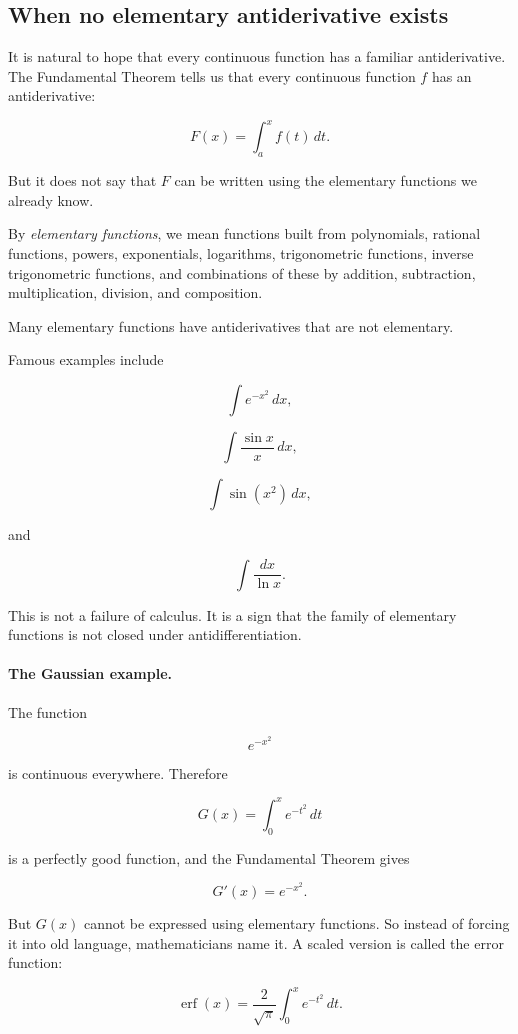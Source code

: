 \subsection{When no elementary antiderivative exists}
\label{subsec:no-elementary-antiderivative}

It is natural to hope that every continuous function has a familiar antiderivative.
The Fundamental Theorem tells us that every continuous function \(f\) has an
antiderivative:

\[
F(x)=\int_a^x f(t)\,dt.
\]

But it does not say that \(F\) can be written using the elementary functions we already
know.

By \emph{elementary functions}, we mean functions built from polynomials, rational
functions, powers, exponentials, logarithms, trigonometric functions, inverse
trigonometric functions, and combinations of these by addition, subtraction,
multiplication, division, and composition.

Many elementary functions have antiderivatives that are not elementary.

Famous examples include

\[
\int e^{-x^2}\,dx,
\]

\[
\int \frac{\sin x}{x}\,dx,
\]

\[
\int \sin(x^2)\,dx,
\]

and

\[
\int \frac{dx}{\ln x}.
\]

This is not a failure of calculus.  It is a sign that the family of elementary functions is
not closed under antidifferentiation.

\paragraph{The Gaussian example.}
The function

\[
e^{-x^2}
\]

is continuous everywhere.  Therefore

\[
G(x)=\int_0^x e^{-t^2}\,dt
\]

is a perfectly good function, and the Fundamental Theorem gives

\[
G'(x)=e^{-x^2}.
\]

But \(G(x)\) cannot be expressed using elementary functions.  So instead of forcing it
into old language, mathematicians name it.  A scaled version is called the error function:

\[
\operatorname{erf}(x)
=
\frac{2}{\sqrt{\pi}}\int_0^x e^{-t^2}\,dt.
\]

